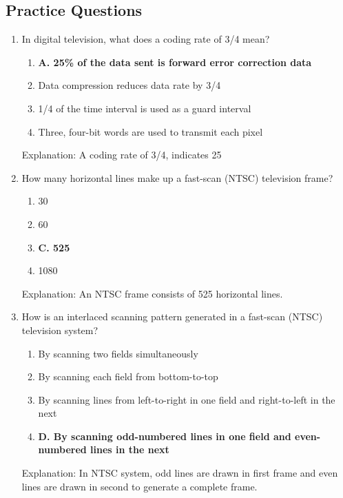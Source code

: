 \subsection*{Practice Questions}
\begin{enumerate}
    \item In digital television, what does a coding rate of 3/4 mean?
    \begin{enumerate}
       \item \textbf{A. 25\% of the data sent is forward error correction data}
        \item  Data compression reduces data rate by 3/4
       \item  1/4 of the time interval is used as a guard interval
       \item  Three, four-bit words are used to transmit each pixel
    \end{enumerate}
        \textcolor{myred}{Explanation:}
    A coding rate of 3/4, indicates 25%

  \item How many horizontal lines make up a fast-scan (NTSC) television frame?
      \begin{enumerate}
      \item  30
        \item  60
     \item \textbf{C. 525}
       \item  1080
    \end{enumerate}
    \textcolor{myred}{Explanation:}
     An NTSC frame consists of 525 horizontal lines.

  \item How is an interlaced scanning pattern generated in a fast-scan (NTSC) television system?
      \begin{enumerate}
        \item  By scanning two fields simultaneously
       \item  By scanning each field from bottom-to-top
     \item  By scanning lines from left-to-right in one field and right-to-left in the next
        \item \textbf{D. By scanning odd-numbered lines in one field and even-numbered lines in the next}
        \end{enumerate}
   \textcolor{myred}{Explanation:}
    In NTSC system, odd lines are drawn in first frame and even lines are drawn in second to generate a complete frame.


\end{enumerate}
